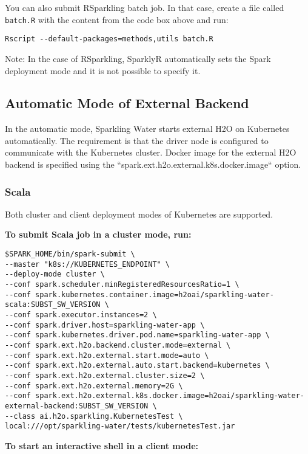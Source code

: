 You can also submit RSparkling batch job. In that case, create a file called \texttt{batch.R} with the content
from the code box above and run:

\begin{lstlisting}[style=Bash]
Rscript --default-packages=methods,utils batch.R
\end{lstlisting}

Note: In the case of RSparkling, SparklyR automatically sets the Spark deployment mode and it is not possible to specify it.

\subsection{Automatic Mode of External Backend}

In the automatic mode, Sparkling Water starts external H2O on Kubernetes automatically. The requirement is that the
driver node is configured to communicate with the Kubernetes cluster. Docker image for the external H2O backend
is specified using the ``spark.ext.h2o.external.k8s.docker.image`` option.

\subsubsection{Scala}

Both cluster and client deployment modes of Kubernetes are supported.

\textbf{To submit Scala job in a cluster mode, run:}

\begin{lstlisting}[style=Bash]
$SPARK_HOME/bin/spark-submit \
--master "k8s://KUBERNETES_ENDPOINT" \
--deploy-mode cluster \
--conf spark.scheduler.minRegisteredResourcesRatio=1 \
--conf spark.kubernetes.container.image=h2oai/sparkling-water-scala:SUBST_SW_VERSION \
--conf spark.executor.instances=2 \
--conf spark.driver.host=sparkling-water-app \
--conf spark.kubernetes.driver.pod.name=sparkling-water-app \
--conf spark.ext.h2o.backend.cluster.mode=external \
--conf spark.ext.h2o.external.start.mode=auto \
--conf spark.ext.h2o.external.auto.start.backend=kubernetes \
--conf spark.ext.h2o.external.cluster.size=2 \
--conf spark.ext.h2o.external.memory=2G \
--conf spark.ext.h2o.external.k8s.docker.image=h2oai/sparkling-water-external-backend:SUBST_SW_VERSION \
--class ai.h2o.sparkling.KubernetesTest \
local:///opt/sparkling-water/tests/kubernetesTest.jar
\end{lstlisting}

\textbf{To start an interactive shell in a client mode:}

